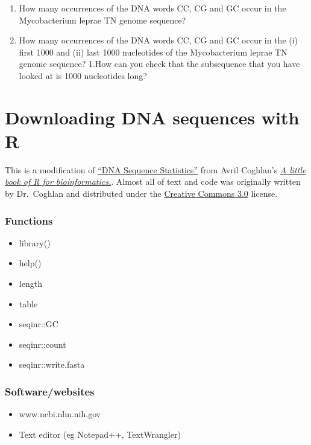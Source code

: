 \documentclass[
]{book}
\providecommand{\tightlist}{%
  \setlength{\itemsep}{0pt}\setlength{\parskip}{0pt}}
\begin{document}
\begin{enumerate}
\item
  How many occurrences of the DNA words CC, CG and GC occur in the Mycobacterium leprae TN genome sequence?
\item
  How many occurrences of the DNA words CC, CG and GC occur in the (i) first 1000 and (ii) last 1000 nucleotides of the Mycobacterium leprae TN genome sequence?
  1.How can you check that the subsequence that you have looked at is 1000 nucleotides long?
\end{enumerate}

\hypertarget{downloading-dna-sequences-with-r}{%
\chapter{Downloading DNA sequences with R}\label{downloading-dna-sequences-with-r}}

This is a modification of \href{https://a-little-book-of-r-for-bioinformatics.readthedocs.io/en/latest/src/chapter1.html}{``DNA Sequence Statistics''} from Avril Coghlan's \href{https://a-little-book-of-r-for-bioinformatics.readthedocs.io/en/latest/index.html}{\emph{A little book of R for bioinformatics.}}. Almost all of text and code was originally written by Dr.~Coghlan and distributed under the \href{https://creativecommons.org/licenses/by/3.0/us/}{Creative Commons 3.0} license.

\hypertarget{functions}{%
\subsection{Functions}\label{functions}}

\begin{itemize}
\tightlist
\item
  library()
\item
  help()
\item
  length
\item
  table
\item
  seqinr::GC
\item
  seqinr::count
\item
  seqinr::write.fasta
\end{itemize}

\hypertarget{softwarewebsites}{%
\subsection{Software/websites}\label{softwarewebsites}}

\begin{itemize}
\tightlist
\item
  www.ncbi.nlm.nih.gov
\item
  Text editor (eg Notepad++, TextWrangler)
\end{itemize}
\end{document}
